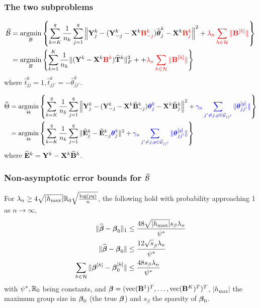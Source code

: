 \documentclass[10pt]{beamer}
\theoremstyle{definition}
\DeclareMathOperator*{\argmin}{argmin}
\DeclareMathOperator*{\ve}{vec}
\begin{document}
\begin{frame}
\frametitle{The two subproblems}
\begin{align*}
\widehat \cB &=
\argmin_{\cB} \left\{
\sum_{k=K}^q \frac{1}{n_k} \sum_{j=1}^q
\left\| \bfY_j^k - ( \bfY_{-j}^k - \bfX^k {\colr \bfB_{-j}^k} ) \widehat \bftheta_j^k
- \bfX^k {\colr \bfB_j^k} \right\|^2
+ {\colr \lambda_n \sum_{h \in \cH} \| \bfB^{[h]} \|} \right\}\\
&= \argmin_{\cB} \left\{ \sum_{k=1}^K \frac{1}{n_k}
\| (\bfY^k - \bfX^k {\colr \bfB^k}) \widehat \bfT^k \|_F^2 +
+ {\colr \lambda_n \sum_{h \in \cH} \| \bfB^{[h]} \|} \right\}
\end{align*}
%
where $\widehat t_{jj}^k = 1, \widehat t_{jj'}^k = - \widehat \theta_{jj'}^k$.

\begin{align*}
\widehat \Theta &=
\argmin_{\Theta} \left\{ \sum_{k=K}^q \frac{1}{n_k} \sum_{j=1}^q
\left\| \bfY_j^k - ( \bfY_{-j}^k - \bfX^k \widehat \bfB_{-j}^k) {\colb \bftheta_j^k}
- \bfX^k \widehat \bfB_j^k \right\|^2 
+ {\colb \gamma_n \sum_{j' \neq j, g \in \cG_{jj'}} \| \bftheta_{jj'}^{[g]} \|} \right\}\\
&= \argmin_{\Theta} \left\{ 
\sum_{k=K}^q \frac{1}{n_k} \sum_{j=1}^q
\| \widehat \bfE_j^k - \widehat \bfE_{-j}^k {\colb \bftheta_j^k} \|^2
+ {\colb \gamma_n \sum_{j' \neq j, g \in \cG_{jj'}} \| \bftheta_{jj'}^{[g]} \|} \right\}
\end{align*}
%
where $\widehat {{\mathbf{E}}}^k = {\mathbf{Y}}^k - {\mathbf{X}}^k \widehat {{\mathbf{B}}}^k$.

\end{frame}


\begin{frame}
\frametitle{Non-asymptotic error bounds for $\widehat {{\cal{B}}}$}

For $\lambda_n \geq 4 \sqrt{| h_{\max} |} {\mathbb{R}}_0 \sqrt{ \frac{ \log(pq)}{n}}$, the following hold with probability approaching 1 as $n \rightarrow \infty$,
%
\begin{align*}
\| \widehat {{\boldsymbol{\beta}}} - {\boldsymbol{\beta}}_0 \|_1 & \leq \frac{48 \sqrt{ | h_{\max} |} s_\beta \lambda_n}{ \psi^*} \\
\| \widehat {{\boldsymbol{\beta}}} - {\boldsymbol{\beta}}_0 \| & \leq \frac{12 \sqrt s_\beta \lambda_n}{ \psi^*} \\
\sum_{h \in {\cal{H}}} \| {\boldsymbol{\beta}}^{[h]} - {\boldsymbol{\beta}}_0^{[h]} \| & \leq \frac{48 s_\beta \lambda_n}{ \psi^*}
\end{align*}
%
with $\psi^*, {\mathbb{R}}_0$ being constants, and $\bfbeta = (\ve(\bfB^1)^T, \ldots, \ve(\bfB^K)^T)^T$, $| h_{\max} |$ the maximum group size in ${\boldsymbol{\beta}}_0$ (the true ${\boldsymbol{\beta}}$) and $s_\beta$ the sparsity of ${\boldsymbol{\beta}}_0$.
\end{frame}
\end{document}
